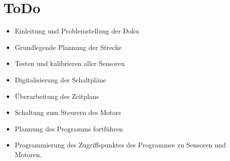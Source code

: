 \documentclass{article}
\begin{document}
\section{ToDo}


\begin{itemize}

\item Einleitung  und Problemstellung der Doku

\item Grundlegende Plannung der Strecke

\item Testen und kalibrieren aller Sensoren

\item Digitalisierung der Schaltpl\"{a}ne

\item \"{U}berarbeitung des Zeitplans

\item Schaltung zum Steurern des Motors

\item Plannung des Programms fortf\"{u}hren

\item Programmierung des Zugriffspunktes des Programmes zu Sensoren und Motoren.

\end{itemize}
\end{document}
